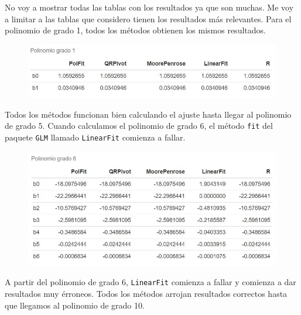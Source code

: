 No voy a mostrar todas las tablas con los resultados ya que son muchas. Me voy a limitar a las tablas que considero tienen los resultados más relevantes. Para el polinomio de grado 1, todos los métodos obtienen los mismos resultados. 

\begin{figure}[h]
\begin{center}
\includegraphics[scale=0.5]{Imagenes/tabla_pol_1.JPG}
\end{center}
\end{figure}

Todos los métodos funcionan bien calculando el ajuste hasta llegar al polinomio de grado 5. Cuando calculamos el polinomio de grado 6, el método \texttt{fit} del paquete \texttt{GLM} llamado \texttt{LinearFit} comienza a fallar. 

\begin{figure}[h]
\begin{center}
\includegraphics[scale=0.5]{Imagenes/tabla_pol_6.JPG}
\end{center}
\end{figure}

A partir del polinomio de grado 6, \texttt{LinearFit} comienza a fallar y comienza a dar resultados muy érroneos. Todos los métodos arrojan resultados correctos hasta que llegamos al polinomio de grado 10. 

